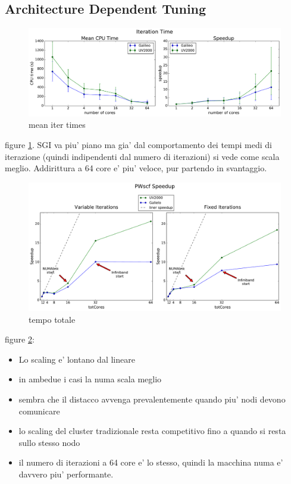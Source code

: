 \documentclass[a4paper,12pt]{article}
\begin{document}
\newpage
\subsection{Architecture Dependent Tuning}\label{sec:resArchDependent}

\begin{figure}[hhh!]
\centerline{ \includegraphics[width=1.2\linewidth]{arch_compare_iterations.pdf}	}
	\caption{mean iter times}
	\label{fig:archCompareIterations}
\end{figure}

figure \ref{fig:archCompareIterations}. SGI va piu' piano ma gia' dal comportamento dei tempi medi di iterazione (quindi indipendenti dal numero di iterazioni) si vede come scala meglio. Addirittura a 64 core e' piu' veloce, pur partendo in svantaggio.


\newpage

\begin{figure}[hhh!]
\centerline{ \includegraphics[width=1.2\linewidth]{arch_global.pdf}	}
	\caption{tempo totale}
	\label{fig:archGlobal}
\end{figure}


figure \ref{fig:archGlobal}: 
\begin{itemize}
	\item Lo scaling e' lontano dal lineare
	\item in ambedue i casi la numa scala meglio
	\item sembra che il distacco avvenga prevalentemente quando piu' nodi devono comunicare
	\item lo scaling del cluster tradizionale resta competitivo fino a quando si resta sullo stesso nodo
	\item il numero di iterazioni a 64 core e' lo stesso, quindi la macchina numa e' davvero piu' performante.
\end{itemize}
\end{document}
